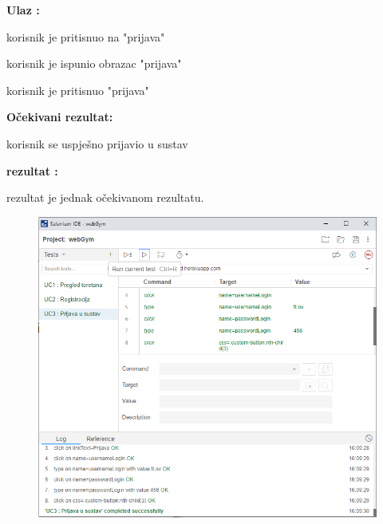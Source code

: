 				\noindent {}
                \begin{packed_item}
						\item  \textbf{Ulaz : } 
						\item[] \begin{packed_enum}
	
							\item korisnik je pritisnuo na "prijava"
							\item korisnik je ispunio obrazac "prijava"
							\item korisnik je pritisnuo "prijava"

						\end{packed_enum}
						\item  \textbf{Očekivani rezultat: } 
						\item[] \begin{packed_enum}
	
							\item korisnik se uspješno prijavio u sustav

						\end{packed_enum}
						
						\item  \textbf{rezultat : }
						\item[] \begin{packed_enum}
	
							\item rezultat je jednak očekivanom rezultatu.

						\end{packed_enum}

				\end{packed_item}
				
				\begin{figure}[H]
        			\hspace*{-1.5cm}
        			\includegraphics[scale=0.5]{dijagrami/UC3.PNG} %
        			\centering
        			\label{fig:promjene}
	        	\end{figure}
				
